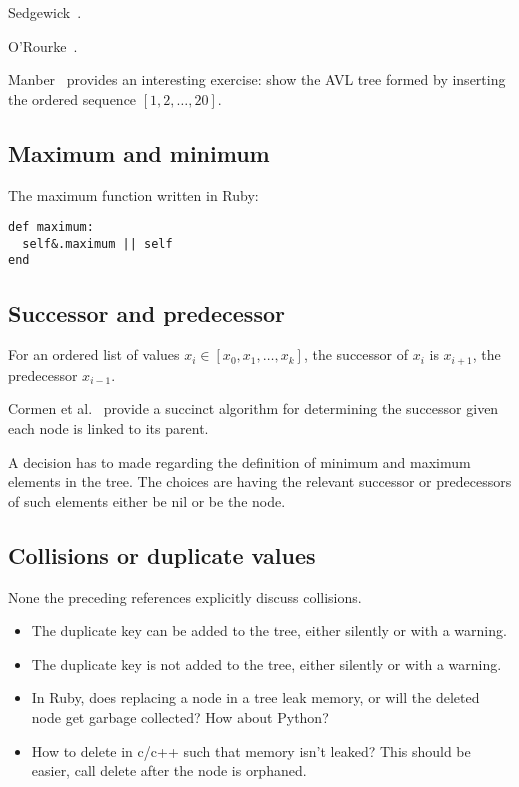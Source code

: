 \documentclass{article}
\begin{document}
Sedgewick~\cite{sedgewick:r1990}.

O'Rourke~\cite{orourke:j1998}.

Manber~\cite[p. 87, Ex. 4.8]{manber:u1989} provides an interesting exercise:
show the AVL tree formed by inserting the ordered sequence $[1, 2, \ldots, 20]$.

\subsection{Maximum and minimum}


The maximum function written in Ruby:
\begin{lstlisting}[frame=single]
def maximum:
  self&.maximum || self
end
\end{lstlisting}


\subsection{Successor and predecessor}

For an ordered list of values $x_i \in [x_0, x_1,\ldots,x_k]$, the successor of
$x_i$ is $x_{i+1}$, the predecessor $x_{i-1}$.

Cormen et al.~\cite[p. 248-249]{cormen:th:1990} provide a succinct algorithm for
determining the successor given each node is linked to its parent.

A decision has to made regarding the definition of minimum and maximum
elements in the tree. The choices are having the relevant successor or
predecessors of such elements either be nil or be the node.

\subsection{Collisions or duplicate values}

None the preceding references explicitly discuss collisions.

\begin{itemize}
\item The duplicate key can be added to the tree, either silently or with a warning.
\item The duplicate key is not added to the tree, either silently or with a warning.

\item In Ruby, does replacing a node in a tree leak memory, or will the deleted node
get garbage collected? How about Python?

\item How to delete in c/c++ such that memory isn't leaked? This should be easier,
call delete after the node is orphaned.
\end{itemize}
\end{document}
